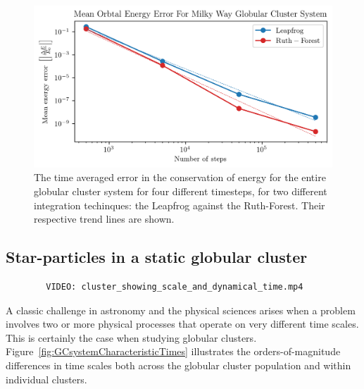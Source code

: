        \begin{figure}
            \centering
            \includegraphics[width=\linewidth]{images/numericalErrorMeanEnergyErrorRuthForestLeapfrog.png}
            \caption[Relative orbital energy comparison between leapfrog and Forest-Ruth]{The time averaged error in the conservation of energy for the entire globular cluster system for four different timesteps, for two different integration techinques: the Leapfrog against the Ruth-Forest. Their respective trend lines are shown.}
            \label{fig:numericalErrorMeanEnergyErrorRuthForestLeapfrog}
        \end{figure}

    \subsection{Star-particles in a static globular cluster}

        \begin{verbatim}
        VIDEO: cluster_showing_scale_and_dynamical_time.mp4
        \end{verbatim}
        
        A classic challenge in astronomy and the physical sciences arises when a problem involves two or more physical processes that operate on very different time scales. This is certainly the case when studying globular clusters. Figure~\ref{fig:GCsystemCharacteristicTimes} illustrates the orders-of-magnitude differences in time scales both across the globular cluster population and within individual clusters.

